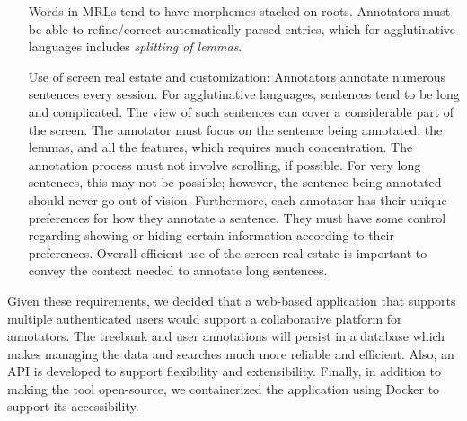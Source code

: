\begin{itemize}[before=\normalfont, font=\itshape, align=left,noitemsep,topsep=0pt,parsep=3pt,partopsep=0pt,labelsep=3pt,align=left]
        Words in MRLs tend to have morphemes stacked on roots.
        Annotators must be able to refine/correct automatically parsed entries, which for agglutinative languages includes \textit{splitting of lemmas}.
    \item[Use of screen real estate and customization:]
        Annotators annotate numerous sentences every session.
        For agglutinative languages, sentences tend to be long and complicated.
        The view of such sentences can cover a considerable part of the screen.
        The annotator must focus on the sentence being annotated, the lemmas, and all the features, which requires much concentration.
        The annotation process must not involve scrolling, if possible.
        For very long sentences, this may not be possible; however, the sentence being annotated should never go out of vision.
        Furthermore, each annotator has their unique preferences for how they annotate a sentence.
        They must have some control regarding showing or hiding certain information according to their preferences.
        Overall efficient use of the screen real estate is important to convey the context needed to annotate long sentences.
\end{itemize}

Given these requirements, we decided that a web-based application that supports multiple authenticated users would support a collaborative platform for annotators.
The treebank and user annotations will persist in a database which makes managing the data and searches much more reliable and efficient.
Also, an API is developed to support flexibility and extensibility.
Finally, in addition to making the tool open-source, we containerized the application using Docker\cite{docker} to support its accessibility.

